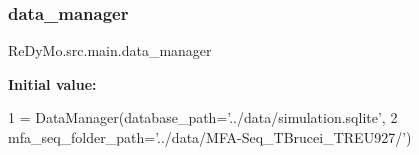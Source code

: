 \subsubsection{\texorpdfstring{data\+\_\+manager}{data\_manager}}
{\footnotesize\ttfamily Re\+Dy\+Mo.\+src.\+main.\+data\+\_\+manager}

{\bfseries Initial value\+:}
\begin{DoxyCode}
1 =  DataManager(database\_path=\textcolor{stringliteral}{'../data/simulation.sqlite'},
2                  mfa\_seq\_folder\_path=\textcolor{stringliteral}{'../data/MFA-Seq\_TBrucei\_TREU927/'})
\end{DoxyCode}

